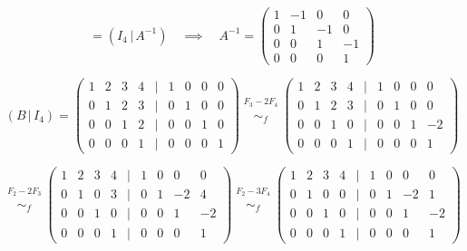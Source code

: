 \documentclass[a4paper,12pt]{article}
\begin{document}
\begin{ejercicio}[title=Ejercicio 14]
\[
= (I_4 \,|\, A^{-1}) \quad \implies \quad
\boxed{
A^{-1} =
\begin{pmatrix}
1 & -1 & 0 & 0\\
0 & 1 & -1 & 0\\
0 & 0 & 1 & -1\\
0 & 0 & 0 & 1
\end{pmatrix}
}
\]

\vspace{0.5em}

\[
(B \,|\, I_4) =
\begin{pmatrix}
1 & 2 & 3 & 4 &\Big|& 1 & 0 & 0 & 0\\
0 & 1 & 2 & 3 &\Big|& 0 & 1 & 0 & 0\\
0 & 0 & 1 & 2 &\Big|& 0 & 0 & 1 & 0\\
0 & 0 & 0 & 1 &\Big|& 0 & 0 & 0 & 1
\end{pmatrix}
\overset{\substack{F_3 - 2F_4 \\ {}}}{\sim_f}
\begin{pmatrix}
1 & 2 & 3 & 4 &\Big|& 1 & 0 & 0 & 0\\
0 & 1 & 2 & 3 &\Big|& 0 & 1 & 0 & 0\\
0 & 0 & 1 & 0 &\Big|& 0 & 0 & 1 & -2\\
0 & 0 & 0 & 1 &\Big|& 0 & 0 & 0 & 1
\end{pmatrix}
\]

\[
\overset{\substack{F_2 - 2F_3 \\ {}}}{\sim_f}
\begin{pmatrix}
1 & 2 & 3 & 4 &\Big|& 1 & 0 & 0 & 0\\
0 & 1 & 0 & 3 &\Big|& 0 & 1 & -2 & 4\\
0 & 0 & 1 & 0 &\Big|& 0 & 0 & 1 & -2\\
0 & 0 & 0 & 1 &\Big|& 0 & 0 & 0 & 1
\end{pmatrix}
\overset{\substack{F_2 - 3F_4 \\ {}}}{\sim_f}
\begin{pmatrix}
1 & 2 & 3 & 4 &\Big|& 1 & 0 & 0 & 0\\
0 & 1 & 0 & 0 &\Big|& 0 & 1 & -2 & 1\\
0 & 0 & 1 & 0 &\Big|& 0 & 0 & 1 & -2\\
0 & 0 & 0 & 1 &\Big|& 0 & 0 & 0 & 1
\end{pmatrix}
\]
\end{ejercicio}
\end{document}
